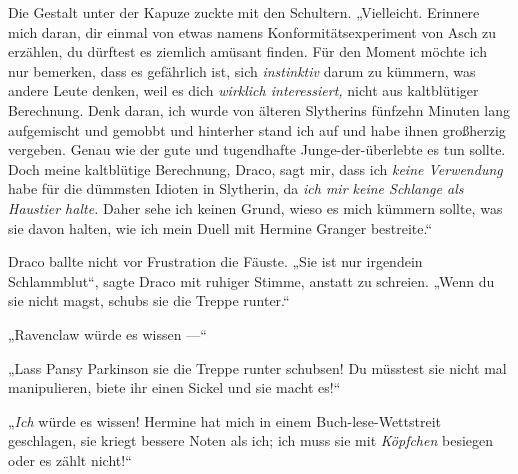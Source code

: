 Die Gestalt unter der Kapuze zuckte mit den Schultern.
„Vielleicht. Erinnere mich daran, dir einmal von etwas namens Konformitätsexperiment von Asch zu erzählen, du dürftest es ziemlich amüsant finden. Für den Moment möchte ich nur bemerken, dass es gefährlich ist, sich \emph{instinktiv} darum zu kümmern, was andere Leute denken, weil es dich \emph{wirklich interessiert,} nicht aus kaltblütiger Berechnung. Denk daran, ich wurde von älteren Slytherins fünfzehn Minuten lang aufgemischt und gemobbt und hinterher stand ich auf und habe ihnen großherzig vergeben. Genau wie der gute und tugendhafte Junge-der-überlebte es tun sollte. Doch meine kaltblütige Berechnung, Draco, sagt mir, dass ich \emph{keine Verwendung} habe für die dümmsten Idioten in Slytherin, da \emph{ich mir keine Schlange als Haustier halte.} Daher sehe ich keinen Grund, wieso es mich kümmern sollte, was sie davon halten, wie ich mein Duell mit Hermine Granger bestreite.“

Draco ballte nicht vor Frustration die Fäuste.
„Sie ist nur irgendein Schlammblut“, sagte Draco mit ruhiger Stimme, anstatt zu schreien.
„Wenn du sie nicht magst, schubs sie die Treppe runter.“

„Ravenclaw würde es wissen —“

„Lass Pansy Parkinson sie die Treppe runter schubsen! Du müsstest sie nicht mal manipulieren, biete ihr einen Sickel und sie macht es!“

„\emph{Ich} würde es wissen! Hermine hat mich in einem Buch-lese-Wettstreit geschlagen, sie kriegt bessere Noten als ich; ich muss sie mit \emph{Köpfchen} besiegen oder es zählt nicht!“

